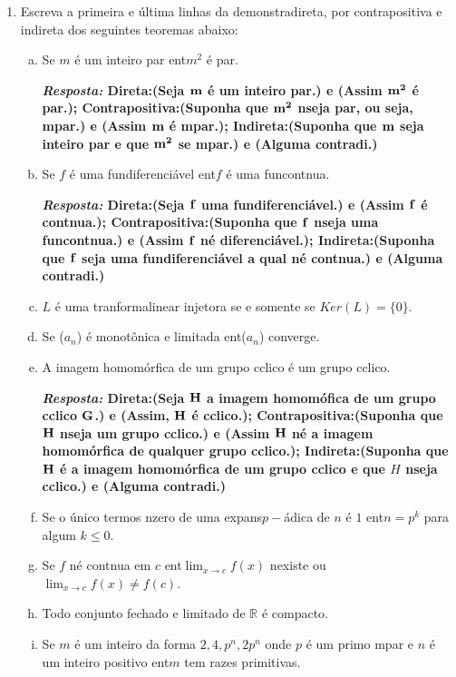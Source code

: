 \begin{enumerate}[{\bf 1.}]
\item Escreva a primeira e  \'ultima linhas da demonstra\cao direta, por contrapositiva e indireta dos seguintes teoremas abaixo: 
\begin{enumerate}[a)]
\item Se $m$ \'e um inteiro par ent\ao $m^2$ \'e par. 

{\bf{\it Resposta:} Direta:(Seja ${\bf m}$ \'e um inteiro par.) e (Assim ${\bf m^2}$ \'e par.); Contrapositiva:(Suponha que ${\bf m^2}$ n\ao seja par, ou seja, \ih mpar.) e (Assim ${\bf m}$ \'e \ih mpar.); Indireta:(Suponha que ${\bf m}$ seja inteiro par e que ${\bf m^2}$ se \ih mpar.) e (Alguma contradi\caoi.)}

\item Se $f$ \'e uma fun\cao diferenci\'avel ent\ao $f$ \'e uma fun\cao cont\ih nua. 

{\bf{\it Resposta:} Direta:(Seja ${\bf f}$ uma fun\cao diferenci\'avel.) e (Assim ${\bf f}$ \'e cont\ih nua.); Contrapositiva:(Suponha que ${\bf f}$ n\ao seja uma fun\cao cont\ih nua.) e (Assim ${\bf f}$ n\ao \'e diferenci\'avel.); Indireta:(Suponha que ${\bf f}$ seja uma fun\cao diferenci\'avel a qual n\ao \'e cont\ih nua.) e (Alguma contradi\caoi.)}

\item $L$ \'e uma tranforma\cao linear injetora se e somente se $Ker(L)=\{0\}$.
\item Se ($a_n$) \'e monot\^onica e limitada ent\ao ($a_n$) converge.
\item A imagem homom\'orfica de um grupo c\ih clico \'e um grupo c\ih clico. 

{\bf{\it Resposta:} Direta:(Seja ${\bf H}$ a imagem homom\'ofica de um grupo c\ih clico ${\bf G}$.) e (Assim, ${\bf H}$ \'e c\ih clico.); Contrapositiva:(Suponha que ${\bf H}$ n\ao seja um grupo c\ih clico.) e (Assim ${\bf H}$ n\ao \'e a imagem homom\'orfica de qualquer grupo c\ih clico.); Indireta:(Suponha que ${\bf H}$ \'e a imagem homom\'orfica de um grupo c\ih clico e que $H$ n\ao seja c\ih clico.) e (Alguma contradi\caoi.)}

\item Se o \'unico termos n\ao zero de uma expans\ao $p-$\'adica de $n$ \'e $1$ ent\ao $n=p^k$ para algum $k\leq 0$.
\item Se $f$ n\ao \'e cont\ih nua em $c$ ent\ao $\lim_{x\to c}f(x)$ n\ao existe ou $\lim_{x\to c}f(x)\neq f(c)$. 
\item Todo conjunto fechado e limitado de $\mathbb{R}$ \'e compacto.
\item Se $m$ \'e um inteiro da forma $2,4,p^n,2p^n$ onde $p$ \'e um primo \ih mpar e $n$ \'e um inteiro positivo ent\ao $m$ tem ra\ih zes primitivas.
\end{enumerate}


\end{enumerate}
